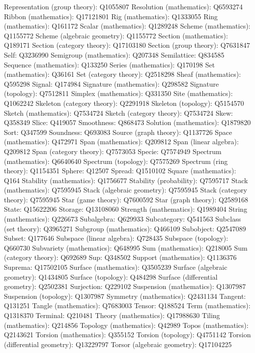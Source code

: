 Representation (group theory): Q1055807
Resolution (mathematics): Q6593274
Ribbon (mathematics): Q17121801
Rig (mathematics): Q1333055
Ring (mathematics): Q161172
Scalar (mathematics): Q1289248
Scheme (mathematics): Q1155772
Scheme (algebraic geometry): Q1155772
Section (mathematics): Q189171
Section (category theory): Q17103180
Section (group theory): Q7631847
Self: Q3236990
Semigroup (mathematics): Q207348
Semilattice: Q834585
Sequence (mathematics): Q133250
Series (mathematics): Q170198
Set (mathematics): Q36161
Set (category theory): Q2518298
Sheaf (mathematics): Q595298
Signal: Q174984
Signature (mathematics): Q298582
Signature (topology): Q7512811
Simplex (mathematics): Q331350
Site (mathematics): Q1062242
Skeleton (category theory): Q2291918
Skeleton (topology): Q5154570
Sketch (mathematics): Q7534724
Sketch (category theory): Q7534724
Skew: Q358349
Slice: Q419057
Smoothness: Q868473
Solution (mathematics): Q1879820
Sort: Q347599
Soundness: Q693083
Source (graph theory): Q1137726
Space (mathematics): Q472971
Span (mathematics): Q209812
Span (linear algebra): Q209812
Span (category theory): Q7573053
Specie: Q7574949
Spectrum (mathematics): Q6640640
Spectrum (topology): Q7575269
Spectrum (ring theory): Q1154351
Sphere: Q12507
Spread: Q1510102
Square (mathematics): Q164
Stability (mathematics): Q1756677
Stability (probability): Q7595717
Stack (mathematics): Q7595945
Stack (algebraic geometry): Q7595945
Stack (category theory): Q7595945
Star (game theory): Q7600592
Star (graph theory): Q2589168
State: Q15622206
Storage: Q13108060
Strength (mathematics): Q1989404
String (mathematics): Q226673
Subalgebra: Q629933
Subcategory: Q541563
Subclass (set theory): Q3965271
Subgroup (mathematics): Q466109
Subobject: Q2547089
Subset: Q177646
Subspace (linear algebra): Q728435
Subspace (topology): Q660730
Subvariety (mathematics): Q648995
Sum (mathematics): Q218005
Sum (category theory): Q692689
Sup: Q348502
Support (mathematics): Q1136376
Suprema: Q17502105
Surface (mathematics): Q3505239
Surface (algebraic geometry): Q1434805
Surface (topology): Q484298
Surface (differential geometry): Q2502381
Surjection: Q229102
Suspension (mathematics): Q1307987
Suspension (topology): Q1307987
Symmetry (mathematics): Q2431134
Tangent: Q131251
Tangle (mathematics): Q7683003
Tensor: Q188524
Term (mathematics): Q1318370
Terminal: Q210481
Theory (mathematics): Q17988630
Tiling (mathematics): Q214856
Topology (mathematics): Q42989
Topos (mathematics): Q2143621
Torsion (mathematics): Q355152
Torsion (topology): Q4751142
Torsion (differential geometry): Q13229797
Torsor (algebraic geometry): Q17104225
